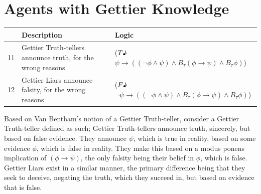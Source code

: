\documentclass[12pt, titlepage, twoside, a4paper]{report}
\newcommand{\true}{$T\text{\textmusicalnote}$}
\newcommand{\false}{$F\text{\textmusicalnote}$}
\begin{document}
\section{Agents with Gettier Knowledge}
\begin{table}[h]
\begin{tabular}{lp{6cm}p{8cm}}
\hline
   & Description                                                 & Logic                                                                                                           \\ \hline
11 & Gettier Truth-tellers announce truth, for the wrong reasons & (\true$\psi \to ((\neg \phi \wedge \psi ) \wedge B_\tau (\phi \to \psi ) \wedge B_\tau \phi)$)       \\
12 & Gettier Liars announce falsity, for the wrong reasons       & (\false$\neg \psi \to ((\neg \phi \wedge \psi ) \wedge B_\tau (\phi \to \psi ) \wedge B_\tau \phi)$) \\ \hline
\end{tabular}
\end{table}
Based on Van Bentham's notion of a Gettier Truth-teller\autocite{BenthemJohanvan2010Mlfo}, consider a Gettier Truth-teller defined as such; Gettier Truth-tellers announce truth, sincerely, but based on false evidence. They announce $\psi$, which is true in reality, based on some evidence $\phi$, which is false in reality. They make this based on a modus ponens implication of $(\phi \to \psi)$, the only falsity being their belief in $\phi$, which is false.\\
Gettier Liars exist in a similar manner, the primary difference being that they seek to deceive, negating the truth, which they succeed in, but based on evidence that is false.
\end{document}
